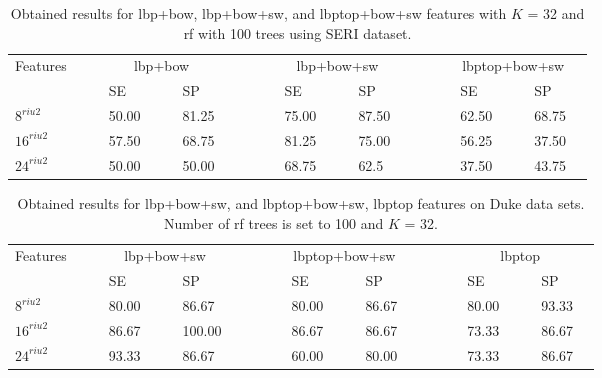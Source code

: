 \begin{table}
\caption{Obtained results for \ac{lbp}+\ac{bow}, \ac{lbp}+\ac{bow}+\ac{sw}, and \ac{lbptop}+\ac{bow}+\ac{sw} features with $K$ = 32 and \ac{rf} with 100 trees using SERI dataset.}
\centering
\begin{tabular}{lcclcclcccclcclcccclcclc}
\toprule
Features 	& & &\multicolumn{4}{c}{\ac{lbp}+\ac{bow}}&	 & & & &\multicolumn{4}{c}{\ac{lbp}+\ac{bow}+\ac{sw}}& & & & &\multicolumn{4}{c}{\ac{lbptop}+\ac{bow}+\ac{sw}} &\\
  \cmidrule(l){2-8}  \cmidrule(l){10-16}  \cmidrule(l){18-24}
	       & & & SE & & & SP & & & & & SE & & & SP & & & & & SE & & & SP & \\
\midrule
 $8^{riu2}$ 						& & & 50.00 & & & 81.25 & & & & & 75.00 & & & 87.50 & & & & & 62.50 & & & 68.75 & \\	
 $16^{riu2}$						& & & 57.50 & & & 68.75 & & & & & 81.25 & & & 75.00 & & & & & 56.25 & & & 37.50 & \\	
 $24^{riu2}$						& & & 50.00 & & & 50.00 & & & & & 68.75 & & & 62.5 & & & & & 37.50 & & & 43.75 & \\
\bottomrule
\end{tabular}
\label{tab:SERIBoWResult}
\end{table}


\begin{table}
\caption{Obtained results for \ac{lbp}+\ac{bow}+\ac{sw}, and \ac{lbptop}+\ac{bow}+\ac{sw}, \ac{lbptop} features on Duke data sets. Number of \ac{rf} trees is set to 100 and $K$ = 32.}
\centering
\begin{tabular}{lcclcclcccclcclcccclcclc}
\toprule
Features 	& & &\multicolumn{4}{c}{\ac{lbp}+\ac{bow}+\ac{sw}}&	 & & & &\multicolumn{4}{c}{\ac{lbptop}+\ac{bow}+\ac{sw}} & & & & &\multicolumn{4}{c}{\ac{lbptop}} &\\
  \cmidrule(l){2-8}  \cmidrule(l){10-16}  \cmidrule(l){18-24}
	         & & & SE & & & SP & & & & & SE & & & SP & & & & & SE & & & SP & \\
\midrule
 $8^{riu2}$ 						& & & 80.00 & & & 86.67 & & & & & 80.00 & & & 86.67 & & & & & 80.00 & & & 93.33 &\\	
 $16^{riu2}$						& & & 86.67 & & & 100.00 & & & & & 86.67 & & & 86.67 & & & & & 73.33 & & & 86.67 & \\	
 $24^{riu2}$						& & & 93.33 & & & 86.67 & & & & & 60.00 & & & 80.00 & & & & & 73.33 & & & 86.67 & \\
\bottomrule
\end{tabular}
\label{tab:DukeBoWResult}
\end{table}


